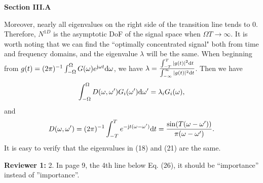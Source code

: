 \documentclass[a4paper,12pt]{article}
\begin{document}
{}
\begin{framed}
    {\bf Section III.A}

\setcounter{equation}{0}

Moreover, nearly all eigenvalues on the right side of the transition line tends to 0. Therefore, $N^{1D}$ is the asymptotic DoF of the signal space when $\Omega T \rightarrow \infty$. {\color{red}It is worth noting that we can find the ``optimally concentrated signal" both from time and frequency domains, and the eigenvalue $\lambda$ will be the same. When beginning from $g(t) = (2\pi)^{-1}\int_{-\Omega}^{\Omega}G(\omega)e^{{\rm j}\omega t} {\rm d}\omega$, we have $\lambda = \frac{\int_{-T}^{T}|g(t)|^2{\rm d}t}{\int_{-\infty}^{\infty}|g(t)|^2{\rm d}t}$. Then we have 
	\begin{equation}
		\begin{aligned}
			\int_{-\Omega}^{\Omega}D(\omega,\omega')G_i(\omega'){\rm d}\omega' = \lambda_i G_i(\omega),
		\end{aligned}
		\label{eqn_1d_omega}
	\end{equation}
	and
	\begin{equation}
		\begin{aligned}
			D(\omega,\omega') = (2\pi)^{-1}\int_{-T}^T e^{-{\rm j}t(\omega-\omega')}{\rm d}t = \frac{\sin(T(\omega-\omega'))}{\pi(\omega-\omega')}.
		\end{aligned}
	\end{equation}
	It is easy to verify that the eigenvalues in (18) and (21) are the same.
}

    
\end{framed}



\textbf{Reviewer 1:}
2. In page 9, the 4th line below Eq. (26), it should be “importance” instead of ”importance”.
\end{document}
